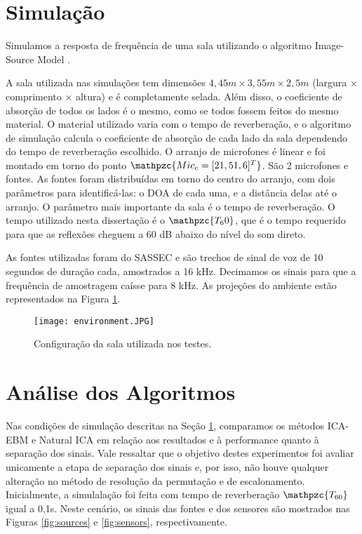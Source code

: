 \label{chap:4}
\section{Simulação}\label{sec:simulation}

Simulamos a resposta de frequência de uma sala utilizando o algoritmo Image-Source Model \cite{simulation}.

A sala utilizada nas simulações tem dimensões $4,45m \times 3,55m \times 2,5m$ (largura × comprimento × altura) e é completamente selada. Além disso, o coeficiente de absorção de todos os lados é o mesmo, como se todos fossem feitos do mesmo material. O material utilizado varia com o tempo de reverberação, e o algoritmo de simulação calcula o coeficiente de absorção de cada lado da sala dependendo do
tempo de reverberação escolhido. O arranjo de microfones é linear e foi montado em torno do ponto $\mathpzc{Mic_c = [2 1,5 1,6]^T}$. São 2 microfones e fontes. As fontes foram distribuídas em torno do centro do arranjo, com dois parâmetros para identificá-las: o DOA de cada uma, e a distância delas até o arranjo. O parâmetro mais importante da sala é o tempo de reverberação. O tempo utilizado nesta dissertação é o $\mathpzc{T_60}$, que é o tempo requerido para que as reflexões cheguem a 60 dB abaixo do nível do som direto.

As fontes utilizadas foram do SASSEC e são trechos de sinal de voz de 10 segundos de duração cada, amostrados a 16 kHz. Decimamos os sinais para que a frequência de amostragem caísse para 8 kHz. As projeções do ambiente estão representados na Figura \ref{fig:environment}.

\begin{figure}
    \centering
    \texttt{[image: environment.JPG]}
    \caption{Configuração da sala utilizada nos testes.}
    \label{fig:environment}
\end{figure}


 \section{Análise dos Algoritmos}\label{sec:analysis}
    
    Nas condições de simulação descritas na Seção \ref{sec:simulation}, comparamos os métodos ICA-EBM e Natural ICA em relação aos resultados e à performance quanto à separação dos sinais. Vale ressaltar que o objetivo destes experimentos foi avaliar unicamente a etapa de separação dos sinais e, por isso, não houve qualquer alteração no método de resolução da permutação e de escalonamento.  Inicialmente, a simulalação foi feita com tempo de reverberação $\mathpzc{T_{60}}$ igual a 0,1s. Neste cenário, os sinais das fontes e dos sensores são mostrados nas Figuras \ref{fig:sources} e \ref{fig:sensors}, respectivamente.
    
